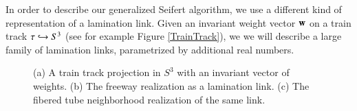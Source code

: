 \documentclass[12pt]{article}
\theoremstyle{remark}
\begin{document}
In order to describe our generalized Seifert algorithm, we use a different kind of representation of a lamination link.   Given an invariant weight vector ${\bf w}$ on a train track $\tau\hookrightarrow S^3$ (see for example Figure \ref{TrainTrack}), we we will describe a large family of lamination links, parametrized by additional real numbers.  


\begin{figure}[H]
\centering
{}
\caption{\footnotesize (a) A train track projection in $S^3$ with an invariant vector of weights.  (b) The freeway realization as a lamination link.   (c)  The fibered tube neighborhood realization of the same link.  }
\label{TubeTrack}
\end{figure}
\end{document}
